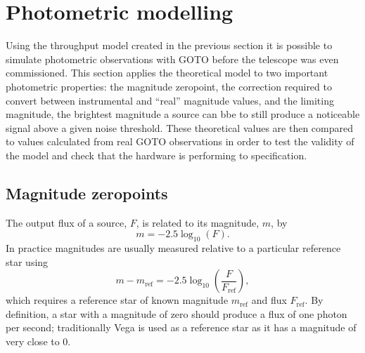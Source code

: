
\newpage
\section{Photometric modelling}
\label{sec:photometry}
\begin{colsection}


\begin{colsection}

Using the throughput model created in the previous section it is possible to simulate photometric observations with GOTO before the telescope was even commissioned. This section applies the theoretical model to two important photometric properties: the magnitude zeropoint, the correction required to convert between instrumental and ``real'' magnitude values, and the limiting magnitude, the brightest magnitude a source can bbe to still produce a noticeable signal above a given noise threshold. These theoretical values are then compared to values calculated from real GOTO observations in order to test the validity of the model and check that the hardware is performing to specification.

\end{colsection}

\subsection{Magnitude zeropoints}
\label{sec:zeropoints}
\begin{colsection}

The output flux of a source, $F$, is related to its magnitude, $m$, by
%
\begin{equation}
    m = -2.5 \log_{10}(F).
    \label{eq:apparent_magnitude}
\end{equation}
%
In practice magnitudes are usually measured relative to a particular reference star using
%
\begin{equation}
    m - m_\text{ref} = -2.5 \log_{10}\left(\frac{F}{F_\text{ref}}\right),
    \label{eq:magnitude_ref}
\end{equation}
%
which requires a reference star of known magnitude $m_\text{ref}$ and flux $F_\text{ref}$. By definition, a star with a magnitude of zero should produce a flux of one photon per second; traditionally Vega is used as a reference star as it has a magnitude of very close to 0.


\end{colsection}
\end{colsection}
